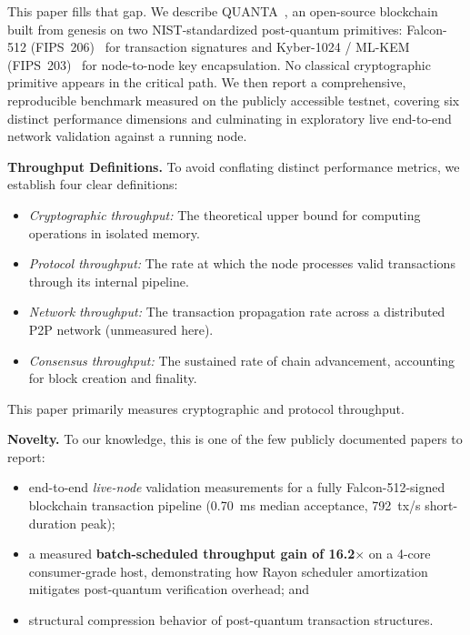 \documentclass[11pt,a4paper]{article}
\begin{document}
This paper fills that gap. We describe QUANTA~\cite{quanta2026}, an
open-source blockchain built from genesis on two NIST-standardized post-quantum
primitives: Falcon-512 (FIPS~206)~\cite{fips206} for transaction signatures
and Kyber-1024 / ML-KEM (FIPS~203)~\cite{fips203} for node-to-node key
encapsulation. No classical cryptographic primitive appears in the critical
path. We then report a comprehensive, reproducible benchmark measured on the
publicly accessible testnet, covering six distinct performance dimensions and
culminating in exploratory live end-to-end network validation against a running node.

\textbf{Throughput Definitions.}
To avoid conflating distinct performance metrics, we establish four clear definitions:
\begin{itemize}
  \item \emph{Cryptographic throughput:} The theoretical upper bound for computing operations in isolated memory.
  \item \emph{Protocol throughput:} The rate at which the node processes valid transactions through its internal pipeline.
  \item \emph{Network throughput:} The transaction propagation rate across a distributed P2P network (unmeasured here).
  \item \emph{Consensus throughput:} The sustained rate of chain advancement, accounting for block creation and finality.
\end{itemize}
This paper primarily measures cryptographic and protocol throughput.

\textbf{Novelty.}  
To our knowledge, this is one of the few publicly documented papers to report:
\begin{itemize}
  \item end-to-end \emph{live-node} validation measurements for a fully
        Falcon-512-signed blockchain transaction pipeline (0.70~ms median acceptance, 792~tx/s
        short-duration peak);
  \item a measured \textbf{batch-scheduled throughput gain of 16.2$\times$}
        on a 4-core consumer-grade host, demonstrating how Rayon scheduler amortization
        mitigates post-quantum verification overhead; and
  \item structural compression behavior of post-quantum transaction structures.
\end{itemize}
\end{document}
